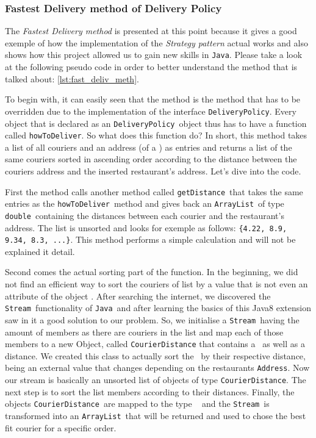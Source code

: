 
\subsubsection{Fastest Delivery method of Delivery Policy} %
\label{ssub:fastest_delivery_method_of_delivery_policy}

The \emph{Fastest Delivery method} is presented at this point because it gives a good exemple of how the implementation of the \emph{Strategy pattern} actual works and also shows how this project allowed us to gain new skills in \lstinline|Java|. Please take a look at the following pseudo code in order to better understand the method that is talked about: 
\ref{lst:fast_deliv_meth}. 

To begin with, it can easily seen that the method is the method that has to be overridden due to the implementation of the interface \lstinline|DeliveryPolicy|. Every object that is declared as an \lstinline|DeliveryPolicy|~object thus has to have a function called \lstinline|howToDeliver|. So what does this function do? In short, this method takes a list of all couriers and an address (of a \Restaurant) as entries and returns a list of the same couriers sorted in ascending order according to the distance between the couriers address and the inserted restaurant's address. Let's dive into the code.

First the method calls another method called \lstinline|getDistance|~that takes the same entries as the \lstinline|howToDeliver|~method and gives back an \lstinline|ArrayList|~of type \lstinline|double|~containing the distances between each courier and the restaurant's address. The list is unsorted and looks for exemple as follows: \lstinline|{4.22, 8.9, 9.34, 8.3, ...}|. This method performs a simple calculation and will not be explained it detail.

Second comes the actual sorting part of the function. In the beginning, we did not find an efficient way to sort the couriers of list by a value that is not even an attribute of the object \Courier. After searching the internet, we discovered the \lstinline|Stream|~functionality of \lstinline|Java|~and after learning the basics of this Java8 extension saw in it a good solution to our problem. So, we initialise a \lstinline|Stream|~having the amount of members as there are couriers in the list and map each of those members to a new Object, called 
\lstinline|CourierDistance| that contains a \Courier~as well as a distance. We created this class to actually sort the \Courier~by their respective distance, being an external value that changes depending on the restaurants \lstinline|Address|. Now our stream is basically an unsorted list of objects of type \lstinline|CourierDistance|. The next step is to sort the list members according to their distances. Finally, the objects \lstinline|CourierDistance|~are mapped to the type \Courier~ and the \lstinline|Stream|~is transformed into an \lstinline|ArrayList|~that will be returned and used to chose the best fit courier for a specific order. 

